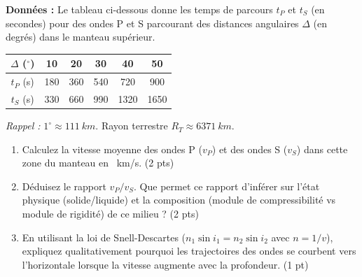 \documentclass[11pt]{article}
\begin{document}
\begin{exercice}
    \textbf{Données :} Le tableau ci-dessous donne les temps de parcours $t_P$ et $t_S$ (en secondes) pour des ondes P et S parcourant des distances angulaires $\Delta$ (en degrés) dans le manteau supérieur.
    
    \begin{center}
    \begin{tabular}{|c|c|c|c|c|c|}
    \hline
    $\Delta$ ($^\circ$) & 10 & 20 & 30 & 40 & 50 \\
    \hline
    $t_P$ (s) & 180 & 360 & 540 & 720 & 900 \\
    \hline
    $t_S$ (s) & 330 & 660 & 990 & 1320 & 1650 \\
    \hline
    \end{tabular}
    \end{center}
    \textit{Rappel :} $1^\circ \approx \SI{111}{km}$. Rayon terrestre $R_T \approx \SI{6371}{km}$.
    
    \begin{enumerate}
        \item Calculez la vitesse moyenne des ondes P ($v_P$) et des ondes S ($v_S$) dans cette zone du manteau en \SI{}{km/s}. (2 pts)
        \item Déduisez le rapport $v_P / v_S$. Que permet ce rapport d'inférer sur l'état physique (solide/liquide) et la composition (module de compressibilité vs module de rigidité) de ce milieu ? (2 pts)
        \item En utilisant la loi de Snell-Descartes ($n_1 \sin i_1 = n_2 \sin i_2$ avec $n = 1/v$), expliquez qualitativement pourquoi les trajectoires des ondes se courbent vers l'horizontale lorsque la vitesse augmente avec la profondeur. (1 pt)
    \end{enumerate}
\end{exercice}
\end{document}
